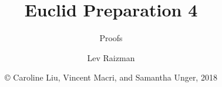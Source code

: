 

\title{Euclid Preparation 4}
\subtitle{Proofs}
\author{Lev Raizman}
\date{\copyright{} Caroline Liu, Vincent Macri, and Samantha Unger, 2018}


	\frame{\titlepage}
